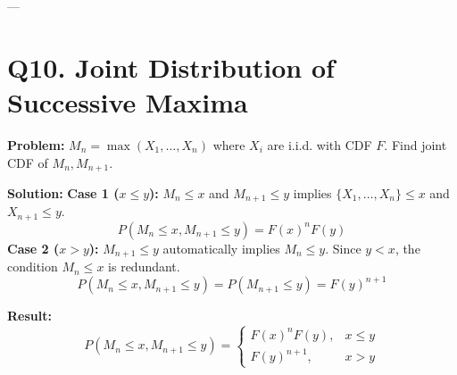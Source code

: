 \documentclass{article}
\begin{document}
---

\section*{Q10. Joint Distribution of Successive Maxima}
\textbf{Problem:} $M_n = \max(X_1, \dots, X_n)$ where $X_i$ are i.i.d. with CDF $F$. Find joint CDF of $M_n, M_{n+1}$.

\textbf{Solution:}
\textbf{Case 1 ($x \le y$):} $M_n \le x$ and $M_{n+1} \le y$ implies $\{X_1, \dots, X_n\} \le x$ and $X_{n+1} \le y$.
\[ P(M_n \le x, M_{n+1} \le y) = F(x)^n F(y) \]
\textbf{Case 2 ($x > y$):} $M_{n+1} \le y$ automatically implies $M_n \le y$. Since $y < x$, the condition $M_n \le x$ is redundant.
\[ P(M_n \le x, M_{n+1} \le y) = P(M_{n+1} \le y) = F(y)^{n+1} \]

\textbf{Result:} 
\[ P(M_n \le x, M_{n+1} \le y) = \begin{cases} F(x)^n F(y), & x \le y \\ F(y)^{n+1}, & x > y \end{cases} \]
\end{document}
